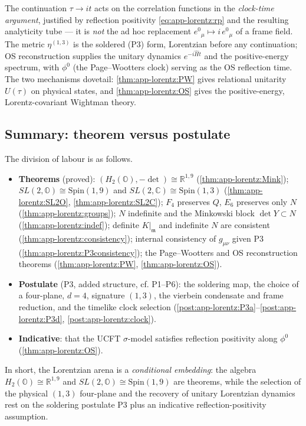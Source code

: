 \begin{remark}
\label{rmk:app-lorentz:notwick}
The continuation $\tau\to it$ acts on the correlation functions in the
\emph{clock-time argument}, justified by reflection positivity
\eqref{eq:app-lorentz:rp} and the resulting analyticity tube --- it is \emph{not} the
ad hoc replacement $e^{0}{}_{\mu}\mapsto i\,e^{0}{}_{\mu}$ of a frame field. The
metric $\eta^{(1,3)}$ is the soldered (P3) form, Lorentzian before any continuation;
OS reconstruction supplies the unitary dynamics $e^{-i\hat{H}t}$ and the
positive-energy spectrum, with $\phi^{0}$ (the Page--Wootters clock) serving as the
OS reflection time. The two mechanisms dovetail:
\autoref{thm:app-lorentz:PW} gives relational unitarity $U(\tau)$ on physical states,
and \autoref{thm:app-lorentz:OS} gives the positive-energy, Lorentz-covariant
Wightman theory.
\end{remark}

\subsection{Summary: theorem versus postulate}
\label{subsec:app-lorentz:summary}

The division of labour is as follows.
\begin{itemize}
\item \textbf{Theorems} (proved): $(H_{2}(\mathbb{O}),-\det)\cong\mathbb{R}^{1,9}$
  (\autoref{thm:app-lorentz:Mink}); $SL(2,\mathbb{O})\cong\mathrm{Spin}(1,9)$ and
  $SL(2,\mathbb{C})\cong\mathrm{Spin}(1,3)$
  (\autoref{thm:app-lorentz:SL2O}, \autoref{thm:app-lorentz:SL2C}); $F_{4}$ preserves
  $Q$, $E_{6}$ preserves only $N$ (\autoref{thm:app-lorentz:groups}); $N$ indefinite
  and the Minkowski block $\det Y\subset N$ (\autoref{thm:app-lorentz:indef});
  definite $K|_{\mathfrak{m}}$ and indefinite $N$ are consistent
  (\autoref{thm:app-lorentz:consistency}); internal consistency of $g_{\mu\nu}$ given
  P3 (\autoref{thm:app-lorentz:P3consistency}); the Page--Wootters and OS
  reconstruction theorems (\autoref{thm:app-lorentz:PW}, \autoref{thm:app-lorentz:OS}).
\item \textbf{Postulate} (P3, added structure, cf. P1--P6): the soldering map, the
  choice of a four-plane, $d=4$, signature $(1,3)$, the vierbein condensate and frame
  reduction, and the timelike clock selection
  (\autoref{post:app-lorentz:P3a}--\autoref{post:app-lorentz:P3d},
  \autoref{post:app-lorentz:clock}).
\item \textbf{Indicative}: that the UCFT $\sigma$-model satisfies reflection
  positivity along $\phi^{0}$ (\autoref{thm:app-lorentz:OS}).
\end{itemize}
In short, the Lorentzian arena is a \emph{conditional embedding}: the algebra
$H_{2}(\mathbb{O})\cong\mathbb{R}^{1,9}$ and $SL(2,\mathbb{O})\cong\mathrm{Spin}(1,9)$
are theorems, while the selection of the physical $(1,3)$ four-plane and the recovery
of unitary Lorentzian dynamics rest on the soldering postulate P3 plus an indicative
reflection-positivity assumption.
